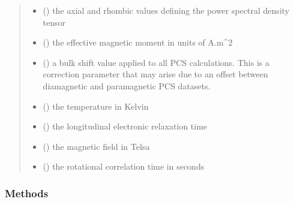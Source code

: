 \documentclass[a4paper,10pt,english,openany,oneside]{sphinxmanual}
\begin{document}
\begin{fulllineitems}
\begin{fulllineitems}
\begin{quote}
\begin{description}
\begin{itemize}
\item {} 
 (\sphinxstyleliteralemphasis{\sphinxupquote{, }}) \textendash{} the axial and rhombic values defining the power spectral density
tensor

\item {} 
 () \textendash{} the effective magnetic moment in units of A.m\textasciicircum{}2

\item {} 
 () \textendash{} a bulk shift value applied to all PCS calculations.
This is a correction parameter that may arise due to an offset
between diamagnetic and paramagnetic PCS datasets.

\item {} 
 () \textendash{} the temperature in Kelvin

\item {} 
 () \textendash{} the longitudinal electronic relaxation time

\item {} 
 () \textendash{} the magnetic field in Telsa

\item {} 
 () \textendash{} the rotational correlation time in seconds

\end{itemize}

\end{description}\end{quote}
\subsubsection*{Methods}


\begin{savenotes}\sphinxatlongtablestart\begin{longtable}{}
\hline


\end{longtable}
\end{savenotes}
\end{fulllineitems}
\end{fulllineitems}
\end{document}
